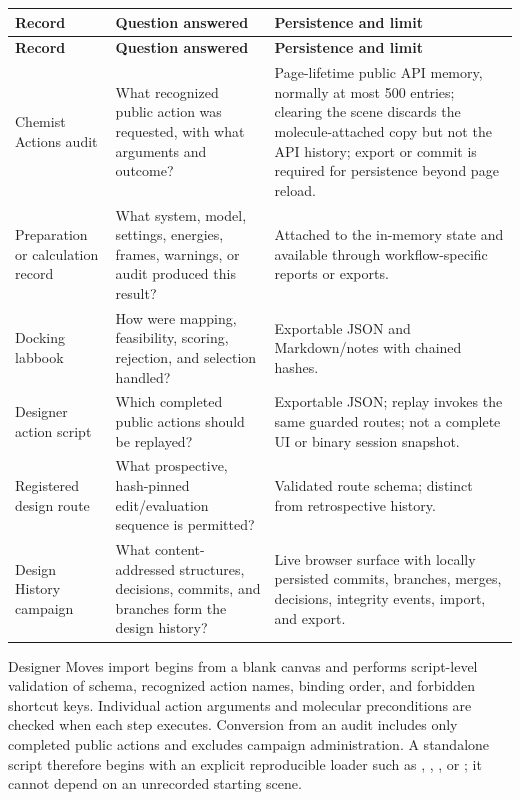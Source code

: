 \begingroup
\footnotesize
\begin{longtable}{@{}p{1.23in}p{2.76in}p{2.61in}@{}}
\toprule
\textbf{Record} & \textbf{Question answered} & \textbf{Persistence and limit}\\
\midrule
\endfirsthead
\toprule
\textbf{Record} & \textbf{Question answered} & \textbf{Persistence and limit}\\
\midrule
\endhead
Chemist Actions audit & What recognized public action was requested, with what arguments and outcome? & Page-lifetime public API memory, normally at most 500 entries; clearing the scene discards the molecule-attached copy but not the API history; export or commit is required for persistence beyond page reload.\\
Preparation or calculation record & What system, model, settings, energies, frames, warnings, or audit produced this result? & Attached to the in-memory state and available through workflow-specific reports or exports.\\
Docking labbook & How were mapping, feasibility, scoring, rejection, and selection handled? & Exportable JSON and Markdown/notes with chained hashes.\\
Designer action script & Which completed public actions should be replayed? & Exportable JSON; replay invokes the same guarded routes; not a complete UI or binary session snapshot.\\
Registered design route & What prospective, hash-pinned edit/evaluation sequence is permitted? & Validated route schema; distinct from retrospective history.\\
Design History campaign & What content-addressed structures, decisions, commits, and branches form the design history? & Live browser surface with locally persisted commits, branches, merges, decisions, integrity events, import, and export.\\
\bottomrule
\end{longtable}
\endgroup


Designer Moves import begins from a blank canvas and performs script-level validation of schema, recognized action names, binding order, and forbidden shortcut keys. Individual action arguments and molecular preconditions are checked when each step executes. Conversion from an audit includes only completed public actions and excludes campaign administration. A standalone script therefore begins with an explicit reproducible loader such as , , , or ; it cannot depend on an unrecorded starting scene.

